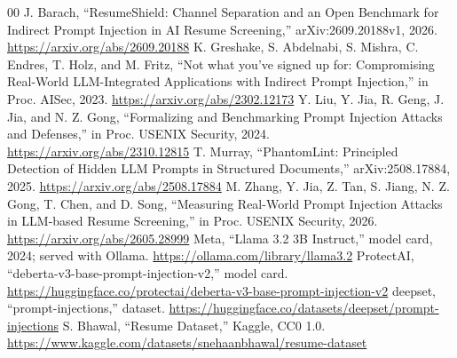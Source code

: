 \documentclass[conference]{IEEEtran}
\begin{document}
\begin{thebibliography}{00}
 J. Barach, ``ResumeShield: Channel Separation and an Open Benchmark for Indirect Prompt Injection in AI Resume Screening,'' arXiv:2609.20188v1, 2026. \url{https://arxiv.org/abs/2609.20188}
 K. Greshake, S. Abdelnabi, S. Mishra, C. Endres, T. Holz, and M. Fritz, ``Not what you've signed up for: Compromising Real-World LLM-Integrated Applications with Indirect Prompt Injection,'' in Proc. AISec, 2023. \url{https://arxiv.org/abs/2302.12173}
 Y. Liu, Y. Jia, R. Geng, J. Jia, and N. Z. Gong, ``Formalizing and Benchmarking Prompt Injection Attacks and Defenses,'' in Proc. USENIX Security, 2024. \url{https://arxiv.org/abs/2310.12815}
 T. Murray, ``PhantomLint: Principled Detection of Hidden LLM Prompts in Structured Documents,'' arXiv:2508.17884, 2025. \url{https://arxiv.org/abs/2508.17884}
 M. Zhang, Y. Jia, Z. Tan, S. Jiang, N. Z. Gong, T. Chen, and D. Song, ``Measuring Real-World Prompt Injection Attacks in LLM-based Resume Screening,'' in Proc. USENIX Security, 2026. \url{https://arxiv.org/abs/2605.28999}
 Meta, ``Llama 3.2 3B Instruct,'' model card, 2024; served with Ollama. \url{https://ollama.com/library/llama3.2}
 ProtectAI, ``deberta-v3-base-prompt-injection-v2,'' model card. \url{https://huggingface.co/protectai/deberta-v3-base-prompt-injection-v2}
 deepset, ``prompt-injections,'' dataset. \url{https://huggingface.co/datasets/deepset/prompt-injections}
 S. Bhawal, ``Resume Dataset,'' Kaggle, CC0 1.0. \url{https://www.kaggle.com/datasets/snehaanbhawal/resume-dataset}
\end{thebibliography}
\end{document}
